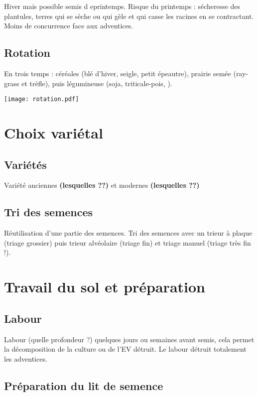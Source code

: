 \documentclass{article}
\begin{document}
Hiver mais possible semis d eprintemps. Risque du printemps : sécheresse des plantules, terres qui se sèche ou qui gèle et qui casse les racines en se contractant. Moins de concurrence face aux adventices.

\subsection{Rotation}

En trois temps : céréales (blé d'hiver, seigle, petit épeautre), prairie semée (ray-grass et trèfle), puis légumineuse (soja, triticale-pois, ).

\begin{center}
	\texttt{[image: rotation.pdf]}
\end{center}

\section{Choix variétal}

\subsection{Variétés}

Variété anciennes\textbf{ (lesquelles ??)} et modernes \textbf{(lesquelles ??)}

\subsection{Tri des semences}

Réutilisation d'une partie des semences. Tri des semences avec un trieur à plaque (triage grossier) puis trieur alvéolaire (triage fin) et triage manuel (triage très fin !). 

\section{Travail du sol et préparation}

\subsection{Labour}

Labour (quelle profondeur ?) quelques jours ou semaines avant semis, cela permet la décomposition de la culture ou de l'EV détruit. 
Le labour détruit totalement les adventices.

\subsection{Préparation du lit de semence}
\end{document}
